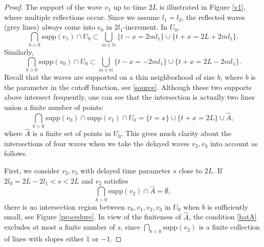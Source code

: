 \documentclass[10pt,a4paper]{amsart}
\begin{document}
\begin{proof}
The support of the wave $v_1$ up to time $2L$ is illustrated in Figure \ref{v1}, where multiple reflections occur. Since we assume $l_1=l_2$, the reflected waves (grey lines) always come into $e_0$ in $2l_1$-increment.
In $U_0$,
$$\bigcap_{b>0}\textrm{supp}(v_1) \cap U_0 \subset \bigcup_{m\in \mathbb{N}} \{t-x=2m l_1\} \cup \{t+x=2L+2ml_1\}.$$
Similarly,
$$\bigcap_{b>0}\textrm{supp}(v_0) \cap U_0 \subset \bigcup_{m\in \mathbb{N}} \{t-x=-2m l_1\} \cup \{t+x=2L-2ml_1\}.$$
Recall that the waves are supported on a thin neighborhood of size $b$, where $b$ is the parameter in the cutoff function, see \eqref{source}.
Although these two supports above intersect frequently, one can see that the intersection is actually two lines union a finite number of points:
\begin{equation}\label{supp-01}
\bigcap_{b>0}\textrm{supp}(v_0) \cap \textrm{supp}(v_1) \cap U_0 =\{t=x\}\cup \{t+x=2L\} \cup \hat{A},
\end{equation}
where $\hat{A}$ is a finite set of points in $U_0$.
This gives much clarity about the intersections of four waves when we take the delayed waves $v_2,v_3$ into account as follows.


\smallskip
First, we consider $v_2,v_3$ with delayed time parameter $s$ close to $2L$. 
If $2l_0=2L-2l_1<s<2L$ and $v_2$ satisfies
\begin{equation}\label{hatA}
\bigcap_{b>0}\textrm{supp}(v_2) \cap \hat{A} =\emptyset,
\end{equation}
there is no intersection region between $v_0,v_1,v_2,v_3$ in $U_0$ when $b$ is sufficiently small, see Figure \ref{procedure}.
In view of the finiteness of $\hat{A}$, the condition \eqref{hatA} excludes at most a finite number of $s$, since $\bigcap_{b>0} \textrm{supp}(v_2)$ is a finite collection of lines with slopes either $1$ or $-1$.


\end{proof}
\end{document}
